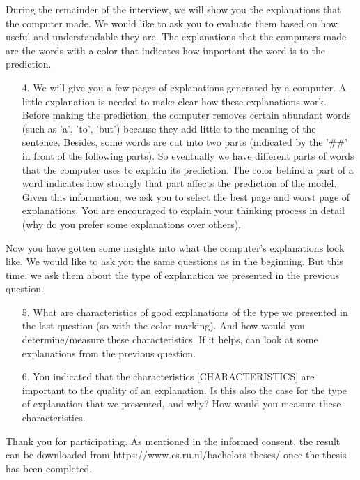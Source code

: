 \documentclass{article}
\theoremstyle{definition}
\theoremstyle{remark}
\begin{document}
During the remainder of the interview, we will show you the explanations that the computer made. We would like to ask you to evaluate them based on how useful and understandable they are. The explanations that the computers made are the words with a color that indicates how important the word is to the prediction.

\begin{enumerate}    
    \item[4.] We will give you a few pages of explanations generated by a computer. A little explanation is needed to make clear how these explanations work. Before making the prediction, the computer removes certain abundant words (such as 'a', 'to', 'but') because they add little to the meaning of the sentence. Besides, some words are cut into two parts (indicated by the '\#\#' in front of the following parts). So eventually we have different parts of words that the computer uses to explain its prediction. The color behind a part of a word indicates how strongly that part affects the prediction of the model. Given this information, we ask you to select the best page and worst page of explanations. You are encouraged to explain your thinking process in detail (why do you prefer some explanations over others).

\end{enumerate}

Now you have gotten some insights into what the computer's explanations look like. We would like to ask you the same questions as in the beginning. But this time, we ask them about the type of explanation we presented in the previous question.

\begin{enumerate}
    \item[5.] What are characteristics of good explanations of the type we presented in the last question (so with the color marking). And how would you determine/measure these characteristics. If it helps, can look at some explanations from the previous question.

    \item[6.] You indicated that the characteristics [CHARACTERISTICS] are important to the quality of an explanation. Is this also the case for the type of explanation that we presented, and why? How would you measure these characteristics.
\end{enumerate}

Thank you for participating. As mentioned in the informed consent, the result can be downloaded from https://www.cs.ru.nl/bachelors-theses/ once the thesis has been completed.
\end{document}
